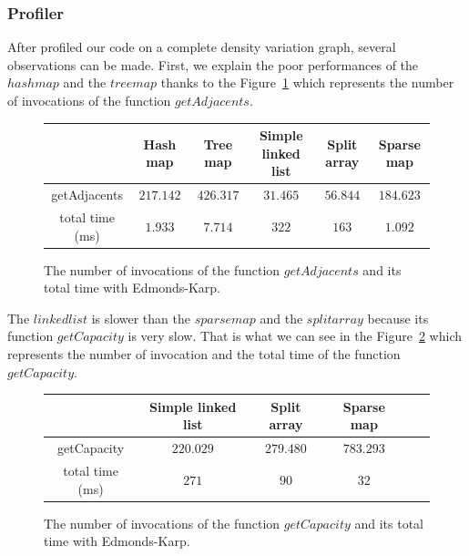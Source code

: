 \subsubsection{Profiler}
After profiled our code on a complete density variation graph, several observations can be made. First, we explain the poor performances of the $hashmap$ and the $treemap$ thanks to the Figure~\ref{fig:ekadja} which represents the number of invocations of the function $getAdjacents$.
\begin{figure}[h]
\centering
\begin{tabular}{|c|c|c|c|c|c|}
	\hline
     & \textbf{Hash map} & \textbf{Tree map} & \textbf{Simple linked list} & \textbf{Split array} & \textbf{Sparse map}\\
     \hline	
   getAdjacents & $217.142$ & $426.317$ & $31.465$ & $56.844$ & $184.623$ \\
   total time (ms) & $1.933$ & $7.714$ & $322$ & $163$ & $1.092$ \\
   \hline
\end{tabular}
\caption{The number of invocations of the function $getAdjacents$ and its total time with Edmonds-Karp.}
\label{fig:ekadja} 
\end{figure}
The $linkedlist$ is slower than the $sparsemap$ and the $splitarray$ because its function $getCapacity$ is very slow. That is what we can see in the Figure~\ref{fig:ekcapa} which represents the number of invocation and the total time of the function $getCapacity$.
\begin{figure}[h]
\centering
\begin{tabular}{|c|c|c|c|c|c|}
	\hline
     & \textbf{Simple linked list} & \textbf{Split array} & \textbf{Sparse map}\\
     \hline	
   getCapacity & $220.029$ & $279.480$ & $783.293$ \\
   total time (ms) & $271$ & $90$ & $32$ \\
   \hline
\end{tabular}
\caption{The number of invocations of the function $getCapacity$ and its total time with Edmonds-Karp.}
\label{fig:ekcapa}
\end{figure}
